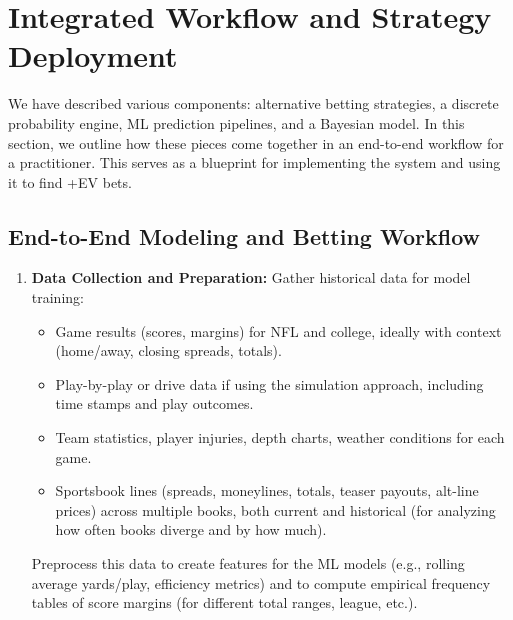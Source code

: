 \documentclass[12pt]{article}
\begin{document}
\section{Integrated Workflow and Strategy Deployment}
We have described various components: alternative betting strategies, a discrete probability engine, ML prediction pipelines, and a Bayesian model. In this section, we outline how these pieces come together in an end-to-end workflow for a practitioner. This serves as a blueprint for implementing the system and using it to find +EV bets.

\subsection{End-to-End Modeling and Betting Workflow}
\begin{enumerate}
    \item \textbf{Data Collection and Preparation:} Gather historical data for model training:
    \begin{itemize}
        \item Game results (scores, margins) for NFL and college, ideally with context (home/away, closing spreads, totals).
        \item Play-by-play or drive data if using the simulation approach, including time stamps and play outcomes.
        \item Team statistics, player injuries, depth charts, weather conditions for each game.
        \item Sportsbook lines (spreads, moneylines, totals, teaser payouts, alt-line prices) across multiple books, both current and historical (for analyzing how often books diverge and by how much).
    \end{itemize}
    Preprocess this data to create features for the ML models (e.g., rolling average yards/play, efficiency metrics) and to compute empirical frequency tables of score margins (for different total ranges, league, etc.).
    

\end{enumerate}
\end{document}
